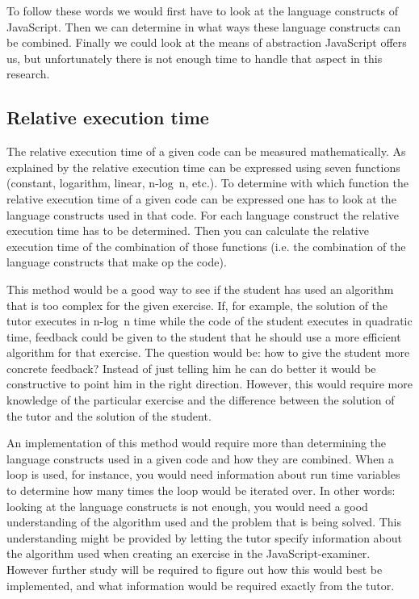 To follow these words we would first have to look at the language constructs of
JavaScript. Then we can determine in what ways these language constructs can be
combined. Finally we could look at the means of abstraction JavaScript offers
us, but unfortunately there is not enough time to handle that aspect in this
research.

\subsection{Relative execution time}

The relative execution time of a given code can be measured mathematically. As
explained by \citet[Chapter 4]{goodrich2008data} the relative execution time
can be expressed using seven functions (constant, logarithm, linear, n-log~n,
etc.). To determine with which function the relative execution time of a given
code can be expressed one has to look at the language constructs used in that
code. For each language construct the relative execution time has to be
determined. Then you can calculate the relative execution time of the
combination of those functions (i.e. the combination of the language constructs
that make op the code).

This method would be a good way to see if the student has used an algorithm
that is too complex for the given exercise. If, for example, the solution of
the tutor executes in n-log~n time while the code of the student executes in
quadratic time, feedback could be given to the student that he should use a
more efficient algorithm for that exercise. The question would be: how to give
the student more concrete feedback? Instead of just telling him he can do
better it would be constructive to point him in the right direction. However,
this would require more knowledge of the particular exercise and the difference
between the solution of the tutor and the solution of the student.

An implementation of this method would require more than determining the
language constructs used in a given code and how they are combined. When a loop
is used, for instance, you would need information about run time variables to
determine how many times the loop would be iterated over. In other words:
looking at the language constructs is not enough, you would need a good
understanding of the algorithm used and the problem that is being solved. This
understanding might be provided by letting the tutor specify information about
the algorithm used when creating an exercise in the
JavaScript-examiner. However further study will be required to figure out how
this would best be implemented, and what information would be required exactly
from the tutor.

